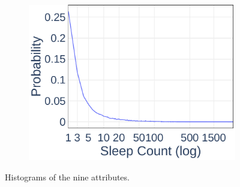 \begin{figure}[ht]
\begin{subfigure}[b]{0.3\textwidth}
    \includegraphics[width=\textwidth]{Figures/Data-Sleep-PDF}
  \end{subfigure}
	\caption{Histograms of the nine attributes.}
	\label{fig:pdf}
\end{figure}

